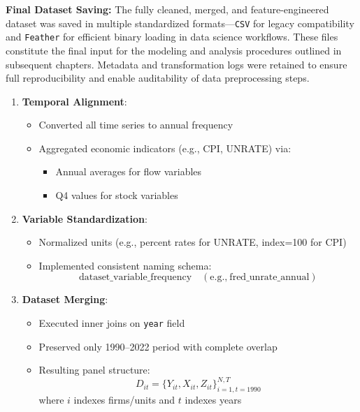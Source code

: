 \textbf{Final Dataset Saving:} The fully cleaned, merged, and feature-engineered dataset was saved in multiple standardized formats—\texttt{CSV} for legacy compatibility and \texttt{Feather} for efficient binary loading in data science workflows. These files constitute the final input for the modeling and analysis procedures outlined in subsequent chapters. Metadata and transformation logs were retained to ensure full reproducibility and enable auditability of data preprocessing steps.
\begin{enumerate}
    \item \textbf{Temporal Alignment}:
    \begin{itemize}
        \item Converted all time series to annual frequency
        \item Aggregated economic indicators (e.g., CPI, UNRATE) via:
        \begin{itemize}
            \item Annual averages for flow variables
            \item Q4 values for stock variables
        \end{itemize}
    \end{itemize}
    
    \item \textbf{Variable Standardization}:
    \begin{itemize}
        \item Normalized units (e.g., percent rates for UNRATE, index=100 for CPI)
        \item Implemented consistent naming schema:
        \begin{equation*}
        \text{dataset}\_\text{variable}\_\text{frequency} \quad (\text{e.g.,}\ \text{fred}\_\text{unrate}\_\text{annual})
        \end{equation*}
    \end{itemize}
    
    \item \textbf{Dataset Merging}:
    \begin{itemize}
        \item Executed inner joins on \texttt{year} field
        \item Preserved only 1990--2022 period with complete overlap
        \item Resulting panel structure:
        \begin{equation}
        D_{it} = \{Y_{it}, X_{it}, Z_{it}\}_{i=1,t=1990}^{N,T}
        \end{equation}
        where $i$ indexes firms/units and $t$ indexes years
    \end{itemize}
    

\end{enumerate}
